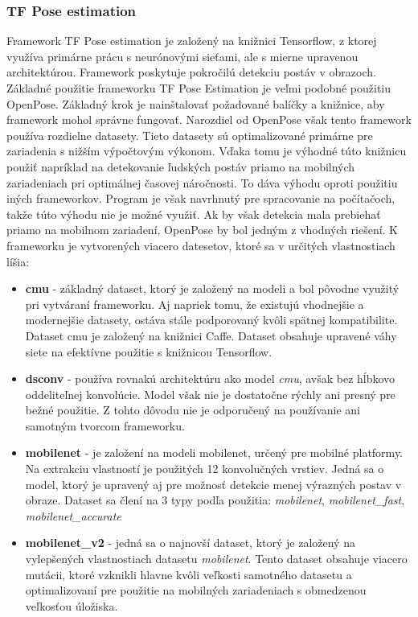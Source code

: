 \documentclass[slovak,master,dept460,male,cpp,cpdeclaration]{diploma}
\begin{document}
\subsubsection*{TF Pose estimation}
Framework TF Pose estimation je založený na knižnici Tensorflow, z ktorej využíva primárne prácu s neurónovými sieťami, ale s mierne upravenou architektúrou. Framework poskytuje pokročilú detekciu postáv v obrazoch. Základné použitie frameworku TF Pose Estimation je veľmi podobné použitiu OpenPose. Základný krok je nainštalovať požadované balíčky a knižnice, aby framework mohol správne fungovať. Narozdiel od OpenPose však tento framework používa rozdielne datasety. Tieto datasety sú optimalizované primárne pre zariadenia s nižším výpočtovým výkonom. Vďaka tomu je výhodné túto knižnicu použiť napríklad na detekovanie ľudských postáv priamo na mobilných zariadeniach pri optimálnej časovej náročnosti. To dáva výhodu oproti použitiu iných frameworkov. Program je však navrhnutý pre spracovanie na   počítačoch, takže túto výhodu nie je možné využiť. Ak by však detekcia mala prebiehať priamo na mobilnom zariadení, OpenPose by bol jedným z vhodných riešení. K frameworku je vytvorených viacero datesetov, ktoré sa v určitých vlastnostiach líšia:
 \begin{itemize}
\item \textbf{cmu} - základný dataset, ktorý je založený na modeli a bol pôvodne využitý pri vytváraní frameworku. Aj napriek tomu, že  existujú vhodnejšie a modernejšie  datasety, ostáva stále podporovaný kvôli spätnej kompatibilite. Dataset cmu je založený na knižnici Caffe. Dataset obsahuje upravené váhy siete na efektívne použitie s knižnicou Tensorflow.
\item \textbf{dsconv} - používa rovnakú architektúru ako model \textit{cmu}, avšak bez hĺbkovo oddeliteľnej konvolúcie. Model však nie je dostatočne rýchly ani presný pre bežné použitie. Z tohto dôvodu nie je odporučený na používanie ani samotným tvorcom frameworku.
\item \textbf{mobilenet} - je založení na modeli mobilenet, určený pre mobilné platformy. Na extrakciu  vlastností je použitých 12 konvolučných vrstiev. Jedná sa o model, ktorý je upravený aj pre  možnosť detekcie menej výrazných postav v obraze. Dataset sa člení  na 3 typy podľa použitia: \textit{mobilenet}, \textit{mobilenet\_fast}, \textit{mobilenet\_accurate}
\item \textbf{mobilenet\_v2} - jedná sa o najnovší dataset, ktorý je založený na vylepšených vlastnostiach datasetu \textit{mobilenet}. Tento dataset obsahuje viacero mutácii, ktoré  vzknikli hlavne kvôli veľkosti samotného datasetu a optimalizovaní pre použitie na mobilných zariadeniach s obmedzenou veľkosťou úložiska.
\end{itemize}
\end{document}
